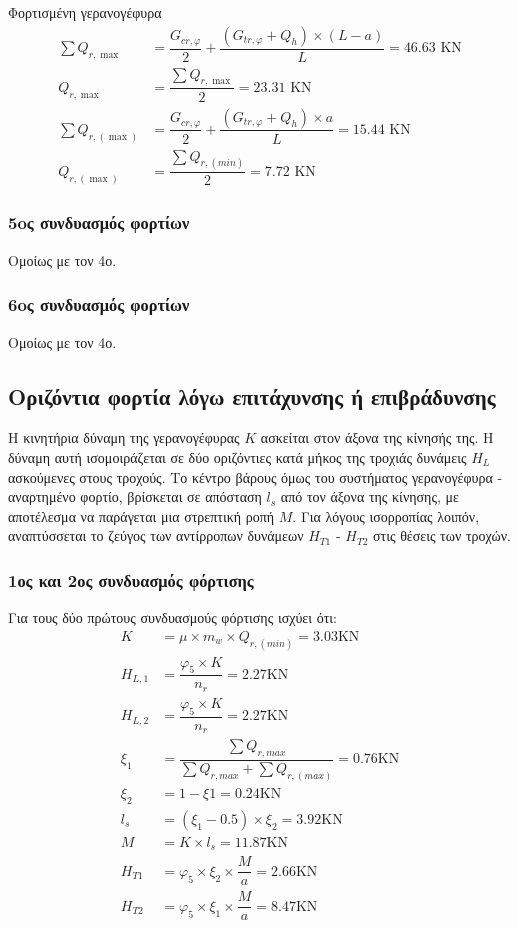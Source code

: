 Φορτισμένη γερανογέφυρα
\begin{align*}
\sum{Q_{r,\max}}     &= \dfrac{G_{cr,φ}}{2} + \dfrac{(G_{tr,φ} + Q_h) \times (L - a)}{L}   =  46.63 \text{ KN} \\
Q_{r,\max}           &= \dfrac{\displaystyle\sum{Q_{r,\max}}}{2}                           =  23.31  \text{ KN} \\
\sum{Q_{r,(\max)}}   &= \dfrac{G_{cr,φ}}{2} + \dfrac{(G_{tr,φ} + Q_h) \times a}{L}         =  15.44 \text{ KN} \\
Q_{r,(\max)}         &= \dfrac{\displaystyle\sum{Q_{r,(min)}}}{2}                          =   7.72 \text{ KN}
\end{align*}

\subsubsection{5oς συνδυασμός φορτίων}Ομοίως με τον 4ο.

\subsubsection{6oς συνδυασμός φορτίων}Ομοίως με τον 4ο.

\subsection{Οριζόντια φορτία λόγω επιτάχυνσης ή επιβράδυνσης}
Η κινητήρια δύναμη της γερανογέφυρας $K$ ασκείται στον άξονα της κίνησής της. H δύναμη αυτή ισομοιράζεται σε δύο οριζόντιες κατά μήκος της τροχιάς δυνάμεις $H_L$ ασκούμενες στους τροχούς. Το κέντρο βάρους όμως του συστήματος γερανογέφυρα - αναρτημένο φορτίο, βρίσκεται σε απόσταση $l_s$ από τον άξονα της κίνησης, με αποτέλεσμα να παράγεται μια στρεπτική ροπή $M$. Για λόγους ισορροπίας λοιπόν, αναπτύσσεται το ζεύγος των αντίρροπων δυνάμεων $H_{T1}$ - $H_{T2}$ στις θέσεις των τροχών.

\subsubsection{1ος και 2ος συνδυασμός φόρτισης}
Για τους δύο πρώτους συνδυασμούς φόρτισης ισχύει ότι:
\begin{align*}
K         &= μ \times m_w \times Q_{r,(min)}  =   3.03 \text{KN} \\ 
H_{L,1}   &= \dfrac{φ_5 \times K} {n_r} =   2.27 \text{KN} \\ 
H_{L,2}   &= \dfrac{φ_5 \times K} {n_r} =   2.27 \text{KN} \\ 
ξ_1       &= \dfrac{\displaystyle\sum{Q_{r,max}}}{\displaystyle\sum{Q_{r,max} + \displaystyle\sum{Q_{r,(max)}}}} =   0.76 \text{KN} \\ 
ξ_2       &= 1 - ξ1 =   0.24 \text{KN} \\ 
l_s       &= (ξ_1 - 0.5) \times ξ_2 =   3.92 \text{KN} \\ 
M         &= K \times l_s =  11.87 \text{KN} \\ 
H_{T1}    &= φ_5 \times ξ_2 \times \dfrac{M}{a} =   2.66 \text{KN} \\ 
H_{T2}    &= φ_5 \times ξ_1 \times \dfrac{M}{a} =   8.47 \text{KN} 
\end{align*}

